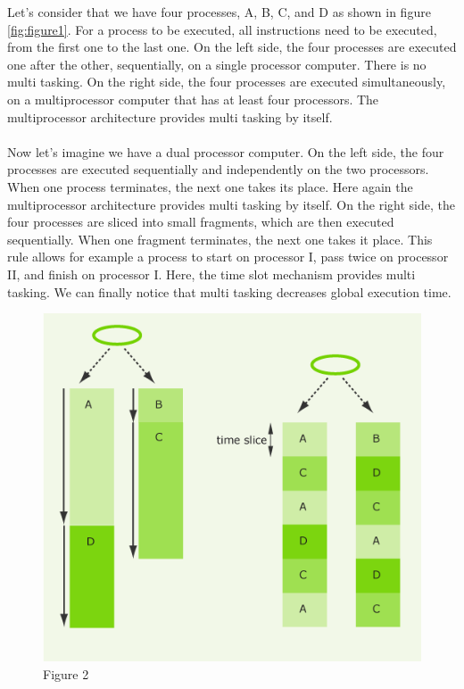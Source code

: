 \documentclass[11pt,a4paper]{scrreprt}
\begin{document}
\clearpage
Let's consider that we have four processes, A, B, C, and D as shown in figure \ref{fig:figure1}. For a process to be executed, all instructions need to be executed, from the first one to the last one. On the left side, the four processes are executed one after the other, sequentially, on a single processor computer. There is no multi tasking. On the right side, the four processes are executed simultaneously, on a multiprocessor computer that has at least four processors. The multiprocessor architecture provides multi tasking by itself. \\\\
Now let's imagine we have a dual processor computer. On the left side, the four processes are executed sequentially and independently on the two processors. When one process terminates, the next one takes its place. Here again the multiprocessor architecture provides multi tasking by itself. On the right side, the four processes are sliced into small fragments, which are then executed sequentially. When one fragment terminates, the next one takes it place. This rule allows for example a process to start on processor I, pass twice on processor II, and finish on processor I. Here, the time slot mechanism provides multi tasking. We can finally notice that multi tasking decreases global execution time.
\begin{figure}[!ht]
\centering
\includegraphics[width=0.6\linewidth]{img/process2.png}
\caption{Figure 2}
\label{fig:figure2}
\end{figure}
\end{document}

